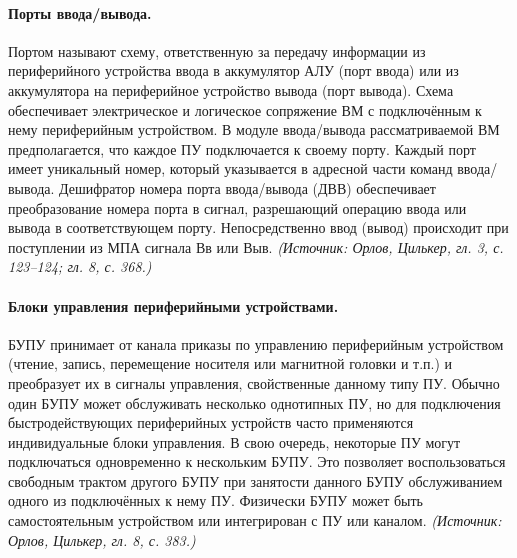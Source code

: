 \documentclass[a4paper,12pt]{article}
\begin{document}
\paragraph{Порты ввода/вывода.}
Портом называют схему, ответственную за передачу информации из периферийного устройства ввода в аккумулятор АЛУ (порт ввода) или из аккумулятора на периферийное устройство вывода (порт вывода). Схема обеспечивает электрическое и логическое сопряжение ВМ с подключённым к нему периферийным устройством. В модуле ввода/вывода рассматриваемой ВМ предполагается, что каждое ПУ подключается к своему порту. Каждый порт имеет уникальный номер, который указывается в адресной части команд ввода/вывода. Дешифратор номера порта ввода/вывода (ДВВ) обеспечивает преобразование номера порта в сигнал, разрешающий операцию ввода или вывода в соответствующем порту. Непосредственно ввод (вывод) происходит при поступлении из МПА сигнала Вв или Выв.
\textit{(Источник: Орлов, Цилькер, гл. 3, с. 123--124; гл. 8, с. 368.)}

\paragraph{Блоки управления периферийными устройствами.}
БУПУ принимает от канала приказы по управлению периферийным устройством (чтение, запись, перемещение носителя или магнитной головки и т.п.) и преобразует их в сигналы управления, свойственные данному типу ПУ. Обычно один БУПУ может обслуживать несколько однотипных ПУ, но для подключения быстродействующих периферийных устройств часто применяются индивидуальные блоки управления. В свою очередь, некоторые ПУ могут подключаться одновременно к нескольким БУПУ. Это позволяет воспользоваться свободным трактом другого БУПУ при занятости данного БУПУ обслуживанием одного из подключённых к нему ПУ. Физически БУПУ может быть самостоятельным устройством или интегрирован с ПУ или каналом.
\textit{(Источник: Орлов, Цилькер, гл. 8, с. 383.)}
\end{document}
